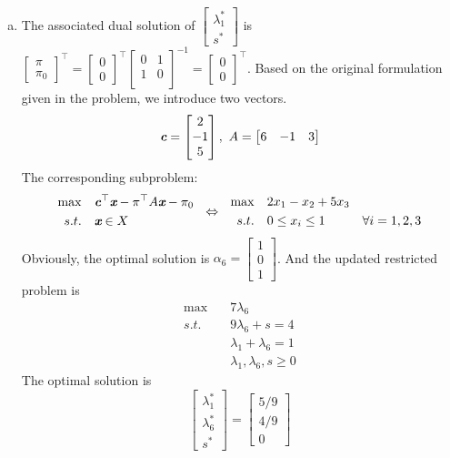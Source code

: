 \begin{enumerate}
\begin{enumerate}[(a)]
	\item The associated dual solution of $\begin{bmatrix}
	\lambda_1^*\\s^*
	\end{bmatrix}$ is $\begin{bmatrix}
	\pi\\\pi_0
	\end{bmatrix}^\top = 
	\begin{bmatrix}
	0\\0
	\end{bmatrix}^\top \begin{bmatrix}
	0 &1\\
	1 & 0\\
	\end{bmatrix}^{-1} = \begin{bmatrix}
	0\\0
	\end{bmatrix}^\top$. Based on the original formulation given in the problem, we introduce two vectors.\[
	\textit{\textbf{c}} = \begin{bmatrix}
	2\\-1\\5
	\end{bmatrix},~A = \begin{bmatrix}
	6 &-1 &3
	\end{bmatrix}
	\]
	The corresponding subproblem:
	\[
	\begin{aligned}
	\max \quad &\textit{\textbf{c}}^\top \textit{\textbf{x}} - \pi^\top A\textit{\textbf{x}} -\pi_0\\
	s.t. \quad &\textit{\textbf{x}} \in X
	\end{aligned} ~~\Leftrightarrow~~ \begin{aligned}
	\max \quad &2x_1-x_2+5x_3\\
	s.t.\quad & 0\le x_i\le 1&\forall i=1,2,3
	\end{aligned}
	\]
	Obviously, the optimal solution is $\alpha_6 = \begin{bmatrix}
	1\\0\\1
	\end{bmatrix}$. And the updated restricted problem is 
	\begin{align*}
	\max \quad & 7\lambda_6\\
	s.t. \quad & 9\lambda_6 + s =4\\
	&\lambda_1 + \lambda_6 = 1\\
	&\lambda_1,\lambda_6,s\ge 0
	\end{align*}
	The optimal solution is $$\begin{bmatrix}
	\lambda_1^*\\\lambda_6^*\\s^*
	\end{bmatrix} = \begin{bmatrix}
	5/9\\4/9\\0
	\end{bmatrix}$$
	

\end{enumerate}
\end{enumerate}
